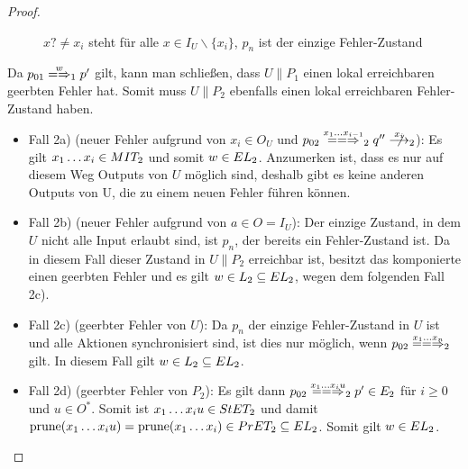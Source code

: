 \begin{proof}
\begin{itemize}
\begin{figure} [h!tbp]
\begin{center}
        \caption{$x?\neq x_i$ steht für alle $x\in I_U\backslash\{x_i\}$, $p_n$
          ist der einzige Fehler-Zustand}
      \label{UmitE}
      \end{center}
      \end{figure}
      Da $p_{01}\weakmay[w]_1p'$ gilt, kann man schließen, dass $U\|P_1$ einen
      lokal erreichbaren geerbten Fehler hat. Somit muss $U\|P_2$ ebenfalls
      einen lokal erreichbaren Fehler-Zustand haben.
      \begin{itemize}
        \item Fall 2a) (neuer Fehler aufgrund von $x_i\in O_U$ und $p_{02}
          \lweakmay[x_1\dots x_{i-1}]_2q''\nmust[x_i]_2$): Es gilt $x_1\dots
          x_i\in MIT _2$ und somit $w\in EL_2$. Anzumerken ist, dass es nur
          auf diesem Weg Outputs von $U$ möglich sind, deshalb gibt es keine
          anderen Outputs von U, die zu einem neuen Fehler führen können.
        \item Fall 2b) (neuer Fehler aufgrund von $a\in O=I_U$): Der einzige
          Zustand, in dem $U$ nicht alle Input erlaubt sind, ist $p_n$, der
          bereits ein Fehler-Zustand ist. Da in diesem Fall dieser Zustand in
          $U\|P_2$ erreichbar ist, besitzt das komponierte \MEIO{} einen
          geerbten Fehler und es gilt $w\in L_2\subseteq EL _2$, wegen dem
          folgenden Fall 2c).
        \item Fall 2c) (geerbter Fehler von $U$): Da $p_n$ der einzige
          Fehler-Zustand in $U$ ist und alle Aktionen synchronisiert sind, ist
          dies nur möglich, wenn $p_{02} \lweakmay[x_1\dots x_n]_2$ gilt. In
          diesem Fall gilt $w\in L_2\subseteq EL _2$.
        \item Fall 2d) (geerbter Fehler von $P_2$): Es gilt dann $p_{02}
          \lweakmay[x_1\dots x_iu]_2 p'\in E_2$ für $i\geq 0$ und $u\in O^*$.
          Somit ist $x_1\dots x_iu\in StET _2$ und damit $\mathrm{prune} (x_1\dots
          x_iu) =\mathrm{prune} (x_1\dots x_i)\in PrET _2\subseteq EL _2$. Somit gilt
          $w\in EL _2$.
      \end{itemize}
  \end{itemize}
\end{proof}


